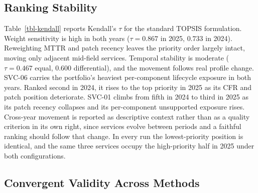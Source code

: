 \documentclass[
  journal,
]{IEEEtran}%
\begin{document}
\subsection{Ranking Stability}\label{sec-stability}

Table~\ref{tbl-kendall} reports Kendall's \(\tau\) for the standard
TOPSIS formulation. Weight sensitivity is high in both years
(\(\tau = 0.867\) in 2025, \(0.733\) in 2024). Reweighting MTTR and
patch recency leaves the priority order largely intact, moving only
adjacent mid-field services. Temporal stability is moderate
(\(\tau = 0.467\) equal, \(0.600\) differential), and the movement
follows real profile change. SVC-06 carries the portfolio's heaviest
per-component lifecycle exposure in both years. Ranked second in 2024,
it rises to the top priority in 2025 as its CFR and patch position
deteriorate. SVC-01 climbs from fifth in 2024 to third in 2025 as its
patch recency collapses and its per-component unsupported exposure
rises. Cross-year movement is reported as descriptive context rather
than as a quality criterion in its own right, since services evolve
between periods and a faithful ranking should follow that change. In
every run the lowest-priority position is identical, and the same three
services occupy the high-priority half in 2025 under both
configurations.

\begin{table}

\caption{\label{tbl-kendall}Kendall's \(\tau\) across ranking
comparisons, standard TOPSIS}


\end{table}%

\subsection{Convergent Validity Across Methods}\label{sec-convergent}
\end{document}
